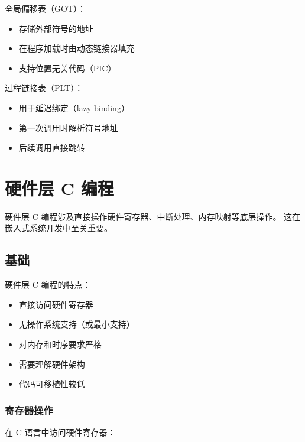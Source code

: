 全局偏移表（GOT）：
\begin{itemize}
  \item 存储外部符号的地址
  \item 在程序加载时由动态链接器填充
  \item 支持位置无关代码（PIC）
\end{itemize}

过程链接表（PLT）：
\begin{itemize}
  \item 用于延迟绑定（lazy binding）
  \item 第一次调用时解析符号地址
  \item 后续调用直接跳转
\end{itemize}

\section{硬件层 C 编程}

硬件层 C 编程涉及直接操作硬件寄存器、中断处理、内存映射等底层操作。
这在嵌入式系统开发中至关重要。

\subsection{基础}


硬件层 C 编程的特点：
\begin{itemize}
  \item 直接访问硬件寄存器
  \item 无操作系统支持（或最小支持）
  \item 对内存和时序要求严格
  \item 需要理解硬件架构
  \item 代码可移植性较低
\end{itemize}

\subsubsection{寄存器操作}


在 C 语言中访问硬件寄存器：

